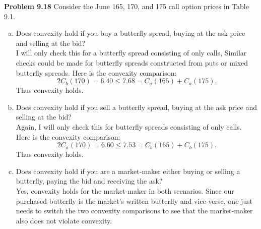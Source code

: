 \documentclass[12pt]{article}
\newcommand{\problem}[1]{\bigskip \noindent \textbf{Problem #1}}
\theoremstyle{plain}
\begin{document}
\problem{9.18} Consider the June 165, 170, and 175 call option prices in Table 9.1.
\begin{enumerate}[(a)]
\item Does convexity hold if you buy a butterfly spread, buying at the ask price and selling at the bid?\\

I will only check this for a butterfly spread consisting of only calls, Similar checks could be made for butterfly spreads constructed from puts or mixed butterfly spreads. Here is the convexity comparison:
\[
2C_b(170) = 6.40 \leq 7.68 = C_a(165) + C_a(175).
\]
Thus convexity holds.

\item Does convexity hold if you sell a butterfly spread, buying at the ask price and selling at the bid?\\

Again, I will only check this for butterfly spreads consisting of only calls. Here is the convexity comparison:
\[
2C_a(170) = 6.60 \leq 7.53 = C_b(165) + C_b(175).
\]
Thus convexity holds.

\item Does convexity hold if you are a market-maker either buying or selling a butterfly, paying the bid and receiving the ask?\\

Yes, convexity holds for the market-maker in both scenarios. Since our purchased butterfly is the market's written butterfly and vice-verse, one just needs to switch the two convexity comparisons to see that the market-maker also does not violate convexity.
\end{enumerate}
\end{document}
